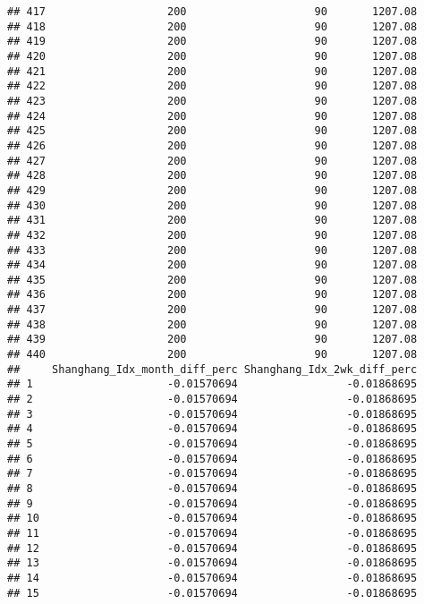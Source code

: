\documentclass[]{article}
\begin{document}
\begin{verbatim}
## 417                   200                    90       1207.08
## 418                   200                    90       1207.08
## 419                   200                    90       1207.08
## 420                   200                    90       1207.08
## 421                   200                    90       1207.08
## 422                   200                    90       1207.08
## 423                   200                    90       1207.08
## 424                   200                    90       1207.08
## 425                   200                    90       1207.08
## 426                   200                    90       1207.08
## 427                   200                    90       1207.08
## 428                   200                    90       1207.08
## 429                   200                    90       1207.08
## 430                   200                    90       1207.08
## 431                   200                    90       1207.08
## 432                   200                    90       1207.08
## 433                   200                    90       1207.08
## 434                   200                    90       1207.08
## 435                   200                    90       1207.08
## 436                   200                    90       1207.08
## 437                   200                    90       1207.08
## 438                   200                    90       1207.08
## 439                   200                    90       1207.08
## 440                   200                    90       1207.08
##     Shanghang_Idx_month_diff_perc Shanghang_Idx_2wk_diff_perc
## 1                     -0.01570694                 -0.01868695
## 2                     -0.01570694                 -0.01868695
## 3                     -0.01570694                 -0.01868695
## 4                     -0.01570694                 -0.01868695
## 5                     -0.01570694                 -0.01868695
## 6                     -0.01570694                 -0.01868695
## 7                     -0.01570694                 -0.01868695
## 8                     -0.01570694                 -0.01868695
## 9                     -0.01570694                 -0.01868695
## 10                    -0.01570694                 -0.01868695
## 11                    -0.01570694                 -0.01868695
## 12                    -0.01570694                 -0.01868695
## 13                    -0.01570694                 -0.01868695
## 14                    -0.01570694                 -0.01868695
## 15                    -0.01570694                 -0.01868695

\end{verbatim}
\end{document}
